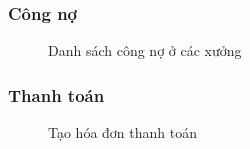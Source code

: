\subsubsection{Công nợ}

\begin{figure}[H]
    \begin{center}
        \caption{Danh sách công nợ ở các xưởng}
        \label{mockup_debt}
    \end{center}
\end{figure}

\subsubsection{Thanh toán}

\begin{figure}[H]
    \begin{center}
        \caption{Tạo hóa đơn thanh toán}
        \label{mockup_payment}
    \end{center}
\end{figure}